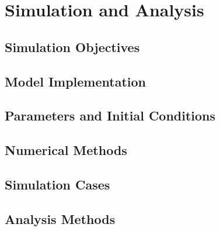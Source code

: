 \chapter{Simulation and Analysis}

\section{Simulation Objectives}

\section{Model Implementation}

\section{Parameters and Initial Conditions}

\section{Numerical Methods}

\section{Simulation Cases}

\section{Analysis Methods}
